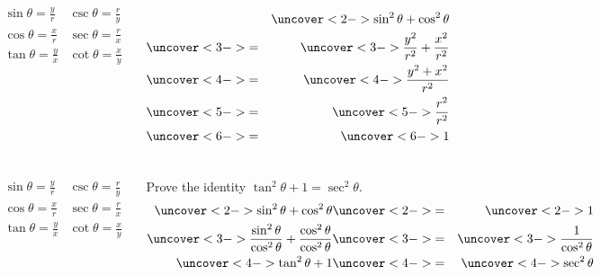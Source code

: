 \begin{frame}
\begin{columns}[c]
\trigIdentitiesPicture
\[
\begin{array}{cc}
\sin \theta = \frac{ y}{ r} &
\csc \theta = \frac{ r}{ y} \\
\cos \theta = \frac{ x}{ r} &
\sec \theta = \frac{ r}{ x} \\
\tan \theta = \frac{ y}{ x} &
\cot \theta = \frac{ x}{ y} \\
\end{array}
\]

\vspace{3cm}
\begin{eqnarray*}
& & \uncover<2->{\sin^2 \theta + \cos^2 \theta}\\
& \uncover<3->{=} & \uncover<3->{\frac{y^2}{r^2} + \frac{x^2}{r^2}}\\
& \uncover<4->{=} & \uncover<4->{\frac{y^2+x^2}{r^2}}\\
& \uncover<5->{=} & \uncover<5->{\frac{r^2}{r^2}}\\
& \uncover<6->{=} & \uncover<6->{1}
\end{eqnarray*}
%
\end{columns}
\end{frame}

\begin{frame}
\begin{columns}[c]
\trigIdentitiesPicture
\[
\begin{array}{cc}
\sin \theta = \frac{ y}{ r} &
\csc \theta = \frac{ r}{ y} \\
\cos \theta = \frac{ x}{ r} &
\sec \theta = \frac{ r}{ x} \\
\tan \theta = \frac{ y}{ x} &
\cot \theta = \frac{ x}{ y} \\
\end{array}
\]

\vspace{3cm}
\begin{example}[$\tan^2 \theta + 1 = \sec^2 \theta$]
Prove the identity $\tan^2 \theta + 1 = \sec^2 \theta$.
\begin{eqnarray*}
\uncover<2->{\sin^2 \theta + \cos^2 \theta} & \uncover<2->{=} & \uncover<2->{1}\\
\uncover<3->{\frac{\sin^2 \theta}{\cos^2\theta} + \frac{\cos^2 \theta}{\cos^2\theta}} & \uncover<3->{=} & \uncover<3->{\frac{1}{\cos^2\theta}}\\
\uncover<4->{\tan^2 \theta + 1} & \uncover<4->{=} & \uncover<4->{\sec^2\theta}
\end{eqnarray*}
\end{example}
\end{columns}
\end{frame}
